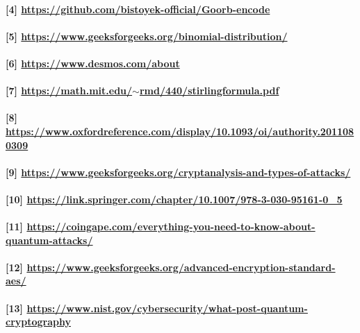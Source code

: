 \documentclass[oneside]{book}
\newcommand{\myparagraph}[1]{\paragraph{\textnormal{#1}}}
\begin{document}
\myparagraph{
[4] \href{https://github.com/bistoyek-official/Goorb-encode}{https://github.com/bistoyek-official/Goorb-encode}
}

\myparagraph{
[5] \href{https://www.geeksforgeeks.org/binomial-distribution/}{https://www.geeksforgeeks.org/binomial-distribution/}
}

\myparagraph{
[6] \href{https://www.desmos.com/about}{https://www.desmos.com/about}
}

\myparagraph{
[7] \href{https://math.mit.edu/~rmd/440/stirlingformula.pdf}{https://math.mit.edu/$\sim$rmd/440/stirlingformula.pdf}
}

\myparagraph{
[8] \href{https://www.oxfordreference.com/display/10.1093/oi/authority.20110803095508254}{https://www.oxfordreference.com/display/10.1093/oi/authority.2011080309\newline 254}
}

\myparagraph{
[9] \href{https://www.geeksforgeeks.org/cryptanalysis-and-types-of-attacks/}{https://www.geeksforgeeks.org/cryptanalysis-and-types-of-attacks/}
}

\myparagraph{
[10] \href{https://link.springer.com/chapter/10.1007/978-3-030-95161-0_5}{https://link.springer.com/chapter/10.1007/978-3-030-95161-0\_5}
}

\myparagraph{
[11] \href{https://coingape.com/everything-you-need-to-know-about-quantum-attacks/}{https://coingape.com/everything-you-need-to-know-about-quantum-attack\newline s/}
}

\myparagraph{
[12] \href{https://www.geeksforgeeks.org/advanced-encryption-standard-aes/}{https://www.geeksforgeeks.org/advanced-encryption-standard-aes/}
}

\myparagraph{
[13] \href{https://www.nist.gov/cybersecurity/what-post-quantum-cryptography}{https://www.nist.gov/cybersecurity/what-post-quantum-cryptography}
}
\end{document}
